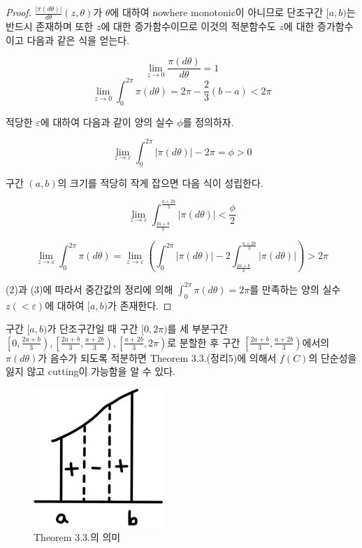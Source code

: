 \documentclass[11pt]{article}
\begin{document}
\begin{proof}
$\frac{|\pi(d\theta)|}{d\theta} (z,\theta)$가 $\theta$에 대하여 nowhere monotonic이 아니므로 단조구간 $[a,b)$는 반드시 존재하며 또한 $z$에 대한 증가함수이므로 이것의 적분함수도 $z$에 대한 증가함수이고 다음과 같은 식을 얻는다.


\begin{equation}
\lim_{z\to 0} \frac{\pi(d\theta)}{d\theta} =1 \nonumber
\end{equation}
\begin{equation}
\lim_{z\to 0} \int_0^{2\pi} \pi(d\theta)=2\pi- \frac23 (b-a) <2\pi
\end{equation}


적당한 $\varepsilon$에 대하여 다음과 같이 양의 실수 $\phi$를 정의하자.

\begin{equation}
\lim_{z\to \varepsilon} \int_0^{2\pi} |\pi(d\theta)|-2\pi=\phi>0 \nonumber
\end{equation}


구간 $(a,b)$의 크기를 적당히 작게 잡으면 다음 식이 성립한다.

\begin{equation}
\lim_{z\to \varepsilon} \int_{\frac{2a+b}3}^{\frac{a+2b}3} |\pi(d\theta)|< \frac{\phi}2 \nonumber
\end{equation}

\begin{equation}
\lim_{z\to \varepsilon} \int _0^{2\pi} \pi(d\theta)=
\lim_{z\to \varepsilon} \left( \int _0^{2\pi} |\pi(d\theta)|-2\int_{\frac{2a+b}3}^{\frac{a+2b}3} |\pi(d\theta)| \right)>2\pi
\end{equation}


(2)과 (3)에 따라서 중간값의 정리에 의해 $\int_0^{2\pi} \pi(d\theta)=2\pi$를 만족하는 양의 실수 $z(<\varepsilon)$에 대하여 $[a,b)$가 존재한다. 
\end{proof}

구간 $[a,b)$가 단조구간일 때 구간 $[0,2\pi)$를 세 부분구간 $\left[0,\frac{2a+b}3\right), \left[\frac{2a+b}3,\frac{a+2b}3\right), \left[\frac{a+2b}3,2\pi\right)$로 분할한 후 구간 $\left[\frac{2a+b}3,\frac{a+2b}3\right)$에서의 $\pi(d\theta)$가 음수가 되도록 적분하면 Theorem 3.3.(정리5)에 의해서 $f(C)$의 단순성을 잃지 않고 cutting이 가능함을 알 수 있다.


\begin{figure}
\centering
\includegraphics{11.png}
\caption{Theorem 3.3.의 의미}
\end{figure}
\end{document}
